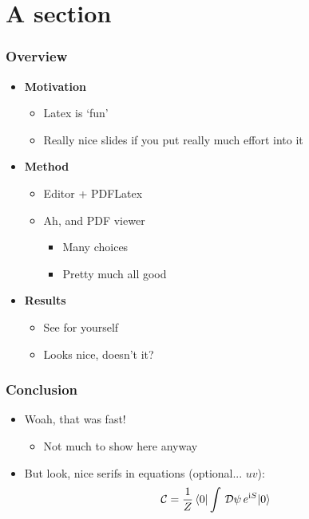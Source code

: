 \documentclass[mathserif, fleqn]{beamer}
\begin{document}
\begin{frame}
  \titlepage
\end{frame}

\section{A section}
\begin{frame}\frametitle{Overview}

  \begin{itemize}\setlength{\itemsep}{1.5ex}
  \item \textbf{Motivation}
    \begin{itemize}\setlength{\itemsep}{1ex}
    \item Latex is `fun'
    \item Really nice slides if you put really much effort into it
    \end{itemize}
  \item \textbf{Method}
    \begin{itemize}\setlength{\itemsep}{1ex}
    \item Editor + PDFLatex
    \item Ah, and PDF viewer
      \begin{itemize}
      \item Many choices
      \item Pretty much all good
      \end{itemize}
    \end{itemize}
  \item \textbf{Results}
    \begin{itemize}\setlength{\itemsep}{1ex}
    \item See for yourself
    \item Looks nice, doesn't it?
    \end{itemize}
  \end{itemize}
\end{frame}

\begin{frame}\frametitle{Conclusion}
  \begin{itemize}\setlength{\itemsep}{2ex}
  \item Woah, that was fast!
    \begin{itemize}
    \item Not much to show here anyway
    \end{itemize}
  \item But look, nice serifs in equations (optional... $uv$):
    \begin{align*}
      \mathcal{C} = \frac1{Z} \braket{0|\int\,\mathcal{D}\psi\,e^{\mathrm{i} S}|0}
    \end{align*}
  \end{itemize}
\end{frame}
\end{document}
